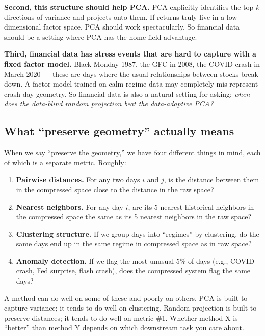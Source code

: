 \documentclass[11pt]{article}
\begin{document}
\textbf{Second, this structure should help PCA.} PCA explicitly identifies the top-$k$ directions of variance and projects onto them. If returns truly live in a low-dimensional factor space, PCA should work spectacularly. So financial data should be a setting where PCA has the home-field advantage.

\textbf{Third, financial data has stress events that are hard to capture with a fixed factor model.} Black Monday 1987, the GFC in 2008, the COVID crash in March 2020 --- these are days where the usual relationships between stocks break down. A factor model trained on calm-regime data may completely mis-represent crash-day geometry. So financial data is also a natural setting for asking: \emph{when does the data-blind random projection beat the data-adaptive PCA?}

\subsection{What ``preserve geometry'' actually means}

When we say ``preserve the geometry,'' we have four different things in mind, each of which is a separate metric. Roughly:

\begin{enumerate}
    \item \textbf{Pairwise distances.} For any two days $i$ and $j$, is the distance between them in the compressed space close to the distance in the raw space?
    \item \textbf{Nearest neighbors.} For any day $i$, are its 5 nearest historical neighbors in the compressed space the same as its 5 nearest neighbors in the raw space?
    \item \textbf{Clustering structure.} If we group days into ``regimes'' by clustering, do the same days end up in the same regime in compressed space as in raw space?
    \item \textbf{Anomaly detection.} If we flag the most-unusual 5\% of days (e.g., COVID crash, Fed surprise, flash crash), does the compressed system flag the same days?
\end{enumerate}

A method can do well on some of these and poorly on others. PCA is built to capture variance; it tends to do well on clustering. Random projection is built to preserve distances; it tends to do well on metric \#1. Whether method X is ``better'' than method Y depends on which downstream task you care about.
\end{document}
